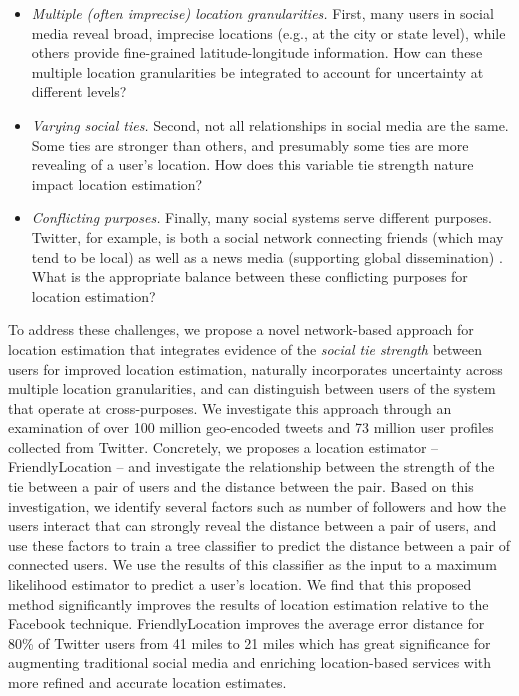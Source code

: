 \documentclass[letterpaper]{article}
\begin{document}
\begin{itemize}
\item \textit{Multiple (often imprecise) location granularities.} First, many users in social media reveal broad, imprecise locations (e.g., at the city or state level), while others provide fine-grained latitude-longitude information. How can these multiple location granularities be integrated to account for uncertainty at different levels? 
\item \textit{Varying social ties.} Second, not all relationships in social media are the same. Some ties are stronger than others, and presumably some ties are more revealing of a user's location. How does this variable tie strength nature impact location estimation? 
\item \textit{Conflicting purposes.} Finally, many social systems serve different purposes. Twitter, for example, is both a social network connecting friends (which may tend to be local) as well as a news media (supporting global dissemination)  \cite{kwak2010why}. What is the appropriate balance between these conflicting purposes for location estimation?
\end{itemize}


To address these challenges, we propose a novel network-based approach for location estimation that integrates evidence of the \textit{social tie strength} between users for improved location estimation, naturally incorporates uncertainty across multiple location granularities, and can distinguish between users of the system that operate at cross-purposes. We investigate this approach through an examination of over 100 million geo-encoded tweets and 73 million user profiles collected from Twitter. Concretely, we proposes a location estimator -- FriendlyLocation -- and investigate the relationship between the strength of the tie between a pair of users and the distance between the pair. Based on this investigation, we identify several factors such as number of followers and how the users interact that can strongly reveal the distance between a pair of users, and use these factors to train a tree classifier to predict the distance between a pair of connected users. We use the results of this classifier as the input to a maximum likelihood estimator to predict a user's location. We find that this proposed method significantly improves the results of location estimation relative to the Facebook technique. FriendlyLocation improves the average error distance for 80\% of Twitter users from 41 miles to 21 miles which has great significance for augmenting traditional social media and enriching location-based services with more refined and accurate location estimates.
\end{document}
